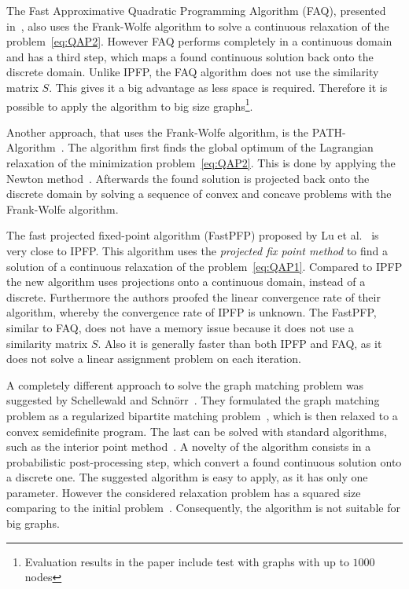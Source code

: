 The Fast Approximative Quadratic Programming Algorithm (FAQ), presented in~\cite{Vogelstein_BrainGraphs}, also uses the Frank-Wolfe algorithm to solve a continuous relaxation of the problem~\eqref{eq:QAP2}. However FAQ performs completely in a continuous domain and has a third step, which maps a found continuous solution back onto the discrete domain. Unlike IPFP, the FAQ algorithm does not use the similarity matrix $S$. This gives it a big advantage as less space is required. Therefore it is possible to apply the algorithm to big size graphs\footnote{Evaluation results in the paper include test with graphs with up to $1000$ nodes}. 

Another approach, that uses the Frank-Wolfe algorithm, is the PATH-Algorithm~\cite{Zazlavskiy2008_PATH}. The algorithm first finds the global optimum of the Lagrangian relaxation of the minimization problem~\eqref{eq:QAP2}. This is done by applying the Newton method~\cite{Book_ConvOpt}. Afterwards the found solution is projected back onto the discrete domain by solving a sequence of convex and concave problems with the Frank-Wolfe algorithm.

The fast projected fixed-point algorithm (FastPFP) proposed by Lu et al.~\cite{FastPFP} is very close to IPFP. This algorithm uses the \emph{projected fix point method} to find a solution of a continuous relaxation of the problem~\eqref{eq:QAP1}. Compared to IPFP the new algorithm uses projections onto a continuous domain, instead of a discrete. Furthermore the authors proofed the linear convergence rate of their algorithm, whereby the convergence rate of IPFP is unknown. The FastPFP, similar to FAQ, does not have a memory issue because it does not use a similarity matrix $S$. Also it is generally faster than both IPFP and FAQ, as it does not solve a linear assignment problem on each iteration.

A completely different approach to solve the graph matching problem was suggested by Schellewald and Schn\"orr~\cite{Schellewald2005}. They formulated the graph matching problem as a regularized bipartite matching problem~\cite{Diestel2000}, which is then relaxed to a convex semidefinite program. The last can be solved with standard algorithms, such as the interior point method~\cite{Book_ConvOpt}. A novelty of the algorithm consists in a probabilistic post-processing step, which convert a found continuous solution  onto a discrete one. The suggested algorithm is easy to apply, as it has only one parameter. However the considered relaxation problem has a squared size comparing to the initial problem~\cite{Cour2006}. Consequently, the algorithm is not suitable for big graphs.
